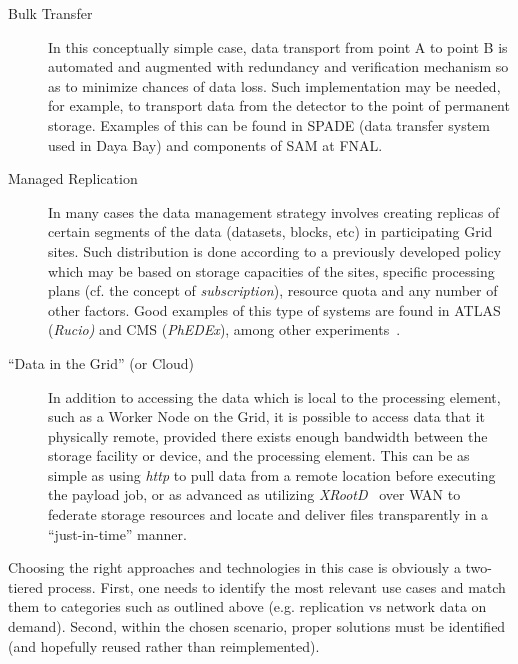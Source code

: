 \begin{description}
\item[Bulk Transfer] In this conceptually simple case, data transport from point A to point B is automated and augmented
with redundancy and verification mechanism so as to minimize chances of data loss. Such implementation may be needed,
for example, to transport data from the detector to the point of permanent storage.
Examples of this can be found in SPADE (data transfer system used in Daya Bay) and components of SAM at FNAL.

\item[Managed Replication] In many cases the data management strategy involves creating replicas of certain segments of the data (datasets, blocks, etc)
in participating Grid sites. Such distribution is done according to a previously developed policy which may be based on storage capacities of 
the sites, specific processing plans (cf. the concept of \textit{subscription}), resource quota and any number of other factors. Good examples of this type of systems are found in
ATLAS (\textit{Rucio)} and CMS (\textit{PhEDEx}), among other experiments~\cite{rucio_chep13,phedex_chep09}.

\item[``Data in the Grid'' (or Cloud)] In addition to accessing the data which is local to the processing element, such as a Worker Node
on the Grid, it is possible to access data that it physically remote, provided there exists enough bandwidth between the storage
facility or device, and the processing element. This can be as simple as using \textit{http} to pull data from a remote location before
executing the payload job, or as advanced as utilizing \textit{XRootD}~\cite{xrootd,xrootd_web} over WAN to federate storage resources and locate and
deliver files transparently in a ``just-in-time'' manner.

\end{description}


Choosing the right approaches and technologies in this case is obviously a two-tiered process. First, one needs to identify the most
 relevant use cases and match them to categories such as outlined above (e.g. replication vs network data on demand). Second, within
 the chosen scenario, proper solutions must be identified (and hopefully reused rather than reimplemented).
   

